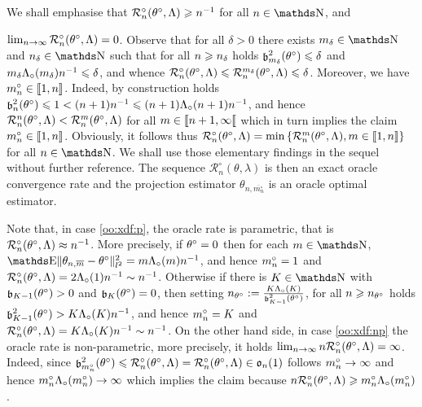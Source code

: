 \begin{rem*}
We shall emphasise that $\oRa{\xdf,\Lambda}\geq \ssY^{-1}$ for all
  $\ssY\in\N$, and
  
  $\lim_{n \rightarrow \infty} \oRa{\xdf,\Lambda}=0$.
  Observe that for all $\delta>0$ there exists $\Di_{\delta}\in\N$ and
  $\ssY_\delta\in\N$ such that for all $\ssY\geq \ssY_{\delta}$ holds
  $\bias[\Di_\delta]^2(\xdf)\leq \delta$ and
  $\Di_{\delta} \oiSv[\Di_\delta] \ssY^{-1}\leq\delta$, and whence
  $\oRa{\xdf,\Lambda}\leq\dRa{\Di_\delta}{\xdf,\Lambda}\leq \delta$.
  Moreover, we have $\oDi{\ssY}\in\nset{1,\ssY}$. Indeed, by construction
  holds
  $\bias[\ssY]^2(\xdf)\leq 1<(\ssY+1)\ssY^{-1}\leq
  (\ssY+1)\oiSv[\ssY+1]{}\ssY^{-1}$, and hence
  $\dRa{\ssY}{\xdf,\Lambda}<\dRa{\Di}{\xdf,\Lambda}$ for all
  $\Di\in \nsetro{\ssY+1,\infty}$ which in turn implies the claim
  $\oDi{\ssY}\in\nset{1,\ssY}$. Obviously, it follows thus
  $\oRa{\xdf,\Lambda}=\min\set{ \dRa{\Di}{\xdf,\Lambda}
    ,\Di\in\nset{1,\ssY}}$ for all $\ssY\in\N$. We shall use those
  elementary findings in the sequel without further reference.
The sequence $\mathcal{R}_{n}^{\circ}(\theta, \lambda)$ is then an exact oracle convergence rate and the projection estimator $\theta_{n, \overline{m_{n}^{\circ}}}$ is an oracle optimal estimator.

\medskip

Note that, in case \ref{oo:xdf:p}, the oracle rate is parametric, that is
$\oRa{\xdf, \Lambda} \approx \ssY^{-1}$. More precisely, if $\xdf=0$ then
for each  $\Di\in\N$,
$\E\Vnormlp{\txdfPr-\xdf}^2=\Di\oiSv[\Di]\ssY^{-1}$,
and hence $\oDi{\ssY}=1$ and $\oRa{\xdf, \Lambda}=2\oiSv[1]\ssY^{-1}\sim\ssY^{-1}$. Otherwise
if there is $K\in\N$  with $\bias[K-1](\xdf)>0$ and
$\bias[K](\xdf)=0$, then setting
$\ssY_{\xdf}:=\tfrac{K\oiSv[K]}{\bias[K-1]^2(\xdf)}$, for all
$\ssY\geq \ssY_{\xdf}$ holds
$\bias[K-1]^2(\xdf)>K\oiSv[K]\ssY^{-1}$, and hence  $\oDi{\ssY}=K$ and
$\oRa{\xdf,\Lambda}= K\oiSv[K]\ssY^{-1}\sim \ssY^{-1}$.
On the other hand side, in case \ref{oo:xdf:np} the oracle rate is
non-parametric, more precisely, it holds
$\lim_{\ssY\to\infty}\ssY\oRa{\xdf,\Lambda}=\infty$. Indeed, since
$\bias[\oDi{\ssY}]^2(\xdf)\leq\oRa{\xdf,\Lambda}=\oRa{\xdf,\Lambda}\in\mathfrak{o}_{n}(1)$ follows $\oDi{\ssY}\to\infty$ and hence
$\oDi{\ssY}\oiSv[\oDi{\ssY}]\to\infty$ which implies the claim because
$\ssY\oRa{\xdf,\Lambda}\geq\oDi{\ssY}\oiSv[\oDi{\ssY}]$.

\medskip


\end{rem*}

